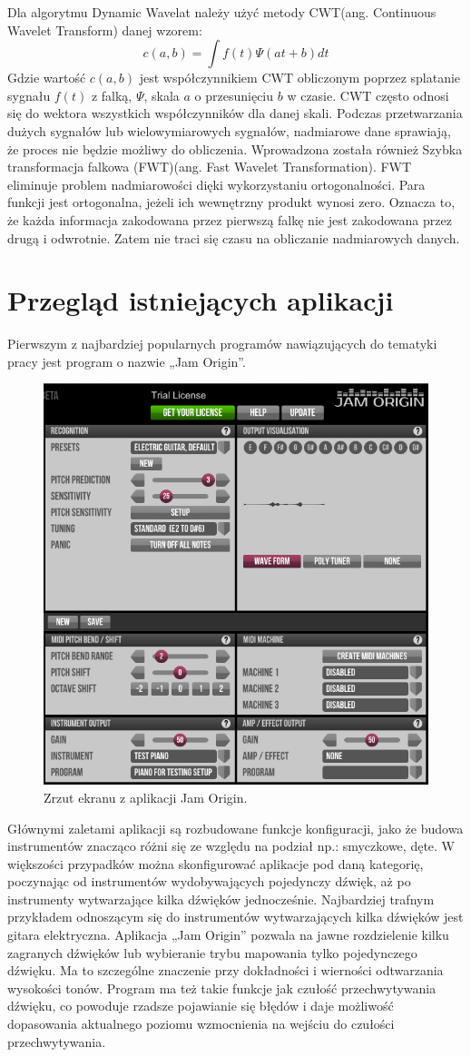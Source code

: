  Dla algorytmu Dynamic Wavelat należy użyć metody CWT(ang. Continuous Wavelet Transform) danej wzorem:
\begin{equation}
\label{equation:1}
    c(a, b) = \int f(t) \Psi (at + b)dt
\end{equation}
Gdzie wartość  $c(a, b)$ jest współczynnikiem CWT  obliczonym poprzez splatanie sygnału $f(t)$ z falką, $\Psi$, skala $a$ o przesunięciu $b$ w czasie.
CWT często odnosi się do wektora wszystkich współczynników dla danej skali.
Podczas przetwarzania dużych sygnałów lub wielowymiarowych sygnałów, nadmiarowe dane sprawiają, że proces nie będzie możliwy do obliczenia. Wprowadzona została również Szybka transformacja falkowa (FWT)(ang. Fast Wavelet Transformation). FWT eliminuje problem nadmiarowości dięki wykorzystaniu ortogonalności. Para funkcji jest ortogonalna, jeżeli ich wewnętrzny produkt wynosi zero. Oznacza to, że każda informacja zakodowana przez pierwszą falkę nie jest zakodowana przez drugą i odwrotnie. Zatem nie traci  się czasu na obliczanie nadmiarowych danych.


\section{{Przegląd istniejących aplikacji}}
Pierwszym z najbardziej popularnych programów nawiązujących do tematyki pracy jest program o nazwie „Jam Origin”. 


\begin{figure}[h!]
  \centering
  \includegraphics[width=0.5\linewidth]{rys/jamOrigin1}
  \caption{Zrzut ekranu z aplikacji Jam Origin.}
  \label{fig:schemat}
\end{figure}


Głównymi zaletami aplikacji są rozbudowane funkcje konfiguracji, jako że budowa instrumentów znacząco różni się ze względu na podział np.: smyczkowe, dęte. W większości przypadków można skonfigurować aplikacje pod daną kategorię, poczynając od instrumentów wydobywających pojedynczy dźwięk, aż po instrumenty wytwarzające kilka dźwięków jednocześnie. Najbardziej trafnym przykładem odnoszącym się do instrumentów wytwarzających kilka dźwięków jest gitara elektryczna. Aplikacja „Jam Origin” pozwala na jawne rozdzielenie kilku zagranych dźwięków lub wybieranie trybu mapowania tylko pojedynczego dźwięku. Ma to szczególne znaczenie przy dokładności i wierności odtwarzania wysokości tonów. Program ma też takie funkcje jak czułość przechwytywania dźwięku, co powoduje rzadsze pojawianie się błędów i daje możliwość dopasowania aktualnego poziomu wzmocnienia na wejściu do czułości przechwytywania.


